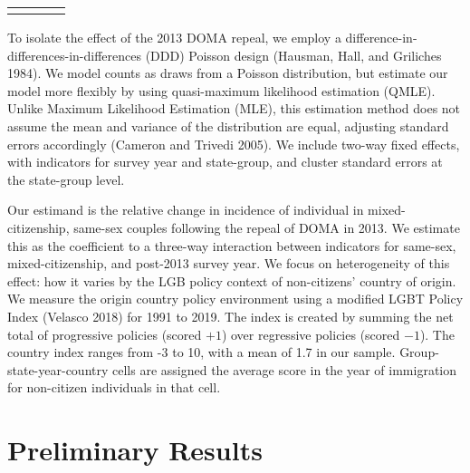 \documentclass[
  12pt,
]{article}
\begin{document}
\begin{longtable}[c]{|p{0.88in}|p{1.40in}|p{1.21in}|p{1.16in}}
\noalign{\global\setlength{\arrayrulewidth}{2pt}}\arrayrulecolor[HTML]{666666}\cline{1-4}



\end{longtable}

To isolate the effect of the 2013 DOMA repeal, we employ a difference-in-differences-in-differences (DDD) Poisson design (Hausman, Hall, and Griliches 1984). We model counts as draws from a Poisson distribution, but estimate our model more flexibly by using quasi-maximum likelihood estimation (QMLE). Unlike Maximum Likelihood Estimation (MLE), this estimation method does not assume the mean and variance of the distribution are equal, adjusting standard errors accordingly (Cameron and Trivedi 2005). We include two-way fixed effects, with indicators for survey year and state-group, and cluster standard errors at the state-group level.

Our estimand is the relative change in incidence of individual in mixed-citizenship, same-sex couples following the repeal of DOMA in 2013. We estimate this as the coefficient to a three-way interaction between indicators for same-sex, mixed-citizenship, and post-2013 survey year. We focus on heterogeneity of this effect: how it varies by the LGB policy context of non-citizens' country of origin. We measure the origin country policy environment using a modified LGBT Policy Index (Velasco 2018) for 1991 to 2019. The index is created by summing the net total of progressive policies (scored \(+1\)) over regressive policies (scored \(-1\)). The country index ranges from -3 to 10, with a mean of 1.7 in our sample. Group-state-year-country cells are assigned the average score in the year of immigration for non-citizen individuals in that cell.

\hypertarget{preliminary-results}{%
\section{Preliminary Results}\label{preliminary-results}}

 
  \providecommand{\huxb}[2]{\arrayrulecolor[RGB]{#1}\global\arrayrulewidth=#2pt}
  \providecommand{\huxvb}[2]{\color[RGB]{#1}\vrule width #2pt}
  \providecommand{\huxtpad}[1]{\rule{0pt}{#1}}
  \providecommand{\huxbpad}[1]{\rule[-#1]{0pt}{#1}}
\end{document}
